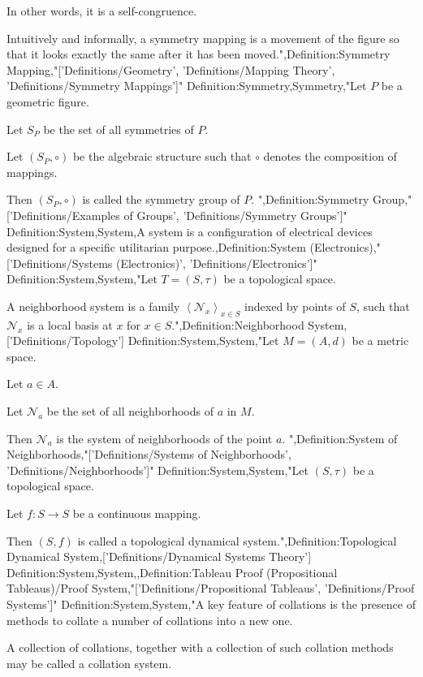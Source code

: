 In other words, it is a self-congruence.


Intuitively and informally, a symmetry mapping is a movement of the figure so that it looks exactly the same after it has been moved.",Definition:Symmetry Mapping,"['Definitions/Geometry', 'Definitions/Mapping Theory', 'Definitions/Symmetry Mappings']"
Definition:Symmetry,Symmetry,"Let $P$ be a geometric figure.

Let $S_P$ be the set of all symmetries of $P$.

Let $\left( S_P, \circ \right)$ be the algebraic structure such that $\circ$ denotes the composition of mappings.


Then $\left( S_P, \circ \right)$ is called the symmetry group of $P$.
",Definition:Symmetry Group,"['Definitions/Examples of Groups', 'Definitions/Symmetry Groups']"
Definition:System,System,A system is a configuration of electrical devices designed for a specific utilitarian purpose.,Definition:System (Electronics),"['Definitions/Systems (Electronics)', 'Definitions/Electronics']"
Definition:System,System,"Let $T = \left( S, \tau \right)$ be a topological space.

A neighborhood system is a family $\left\langle \mathcal N_x \right\rangle_{x \mathop \in S}$ indexed by points of $S$, such that $\mathcal N_x$ is a local basis at $x$ for $x \in S$.",Definition:Neighborhood System,['Definitions/Topology']
Definition:System,System,"Let $M = \left( A, d \right)$ be a metric space.

Let $a \in A$.

Let $\mathcal N_a$ be the set of all neighborhoods of $a$ in $M$.


Then $\mathcal N_a$ is the system of neighborhoods of the point $a$.
",Definition:System of Neighborhoods,"['Definitions/Systems of Neighborhoods', 'Definitions/Neighborhoods']"
Definition:System,System,"Let $\left( S, \tau \right)$ be a topological space.

Let $f: S \to S$ be a continuous mapping.


Then $\left( S, f \right)$ is called a topological dynamical system.",Definition:Topological Dynamical System,['Definitions/Dynamical Systems Theory']
Definition:System,System,,Definition:Tableau Proof (Propositional Tableaus)/Proof System,"['Definitions/Propositional Tableaus', 'Definitions/Proof Systems']"
Definition:System,System,"A key feature of collations is the presence of methods to collate a number of collations into a new one.

A collection of collations, together with a collection of such collation methods may be called a collation system.


